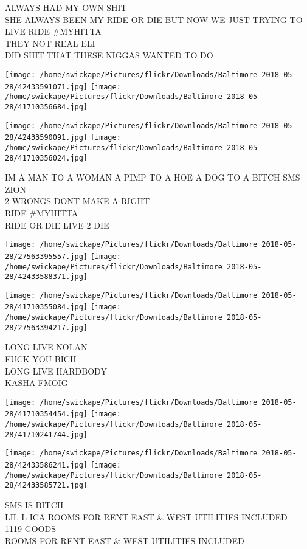 \documentclass[10pt,letterpaper]{article}
\begin{document}
ALWAYS HAD MY OWN SHIT\\
SHE ALWAYS BEEN MY RIDE OR DIE BUT NOW WE JUST TRYING TO LIVE RIDE \#MYHITTA\\
THEY NOT REAL ELI\\
DID SHIT THAT THESE NIGGAS WANTED TO DO
\pagebreak

\texttt{[image: /home/swickape/Pictures/flickr/Downloads/Baltimore 2018-05-28/42433591071.jpg]}
\texttt{[image: /home/swickape/Pictures/flickr/Downloads/Baltimore 2018-05-28/41710356684.jpg]}

\texttt{[image: /home/swickape/Pictures/flickr/Downloads/Baltimore 2018-05-28/42433590091.jpg]}
\texttt{[image: /home/swickape/Pictures/flickr/Downloads/Baltimore 2018-05-28/41710356024.jpg]}

IM A MAN TO A WOMAN A PIMP TO A HOE A DOG TO A BITCH SMS ZION\\
2 WRONGS DONT MAKE A RIGHT\\
RIDE \#MYHITTA\\
RIDE OR DIE LIVE 2 DIE
\pagebreak

\texttt{[image: /home/swickape/Pictures/flickr/Downloads/Baltimore 2018-05-28/27563395557.jpg]}
\texttt{[image: /home/swickape/Pictures/flickr/Downloads/Baltimore 2018-05-28/42433588371.jpg]}

\texttt{[image: /home/swickape/Pictures/flickr/Downloads/Baltimore 2018-05-28/41710355084.jpg]}
\texttt{[image: /home/swickape/Pictures/flickr/Downloads/Baltimore 2018-05-28/27563394217.jpg]}

LONG LIVE NOLAN\\
FUCK YOU BICH\\
LONG LIVE HARDBODY\\
KASHA FMOIG
\pagebreak

\texttt{[image: /home/swickape/Pictures/flickr/Downloads/Baltimore 2018-05-28/41710354454.jpg]}
\texttt{[image: /home/swickape/Pictures/flickr/Downloads/Baltimore 2018-05-28/41710241744.jpg]}

\texttt{[image: /home/swickape/Pictures/flickr/Downloads/Baltimore 2018-05-28/42433586241.jpg]}
\texttt{[image: /home/swickape/Pictures/flickr/Downloads/Baltimore 2018-05-28/42433585721.jpg]}

SMS IS BITCH\\
LIL L ICA ROOMS FOR RENT EAST \& WEST UTILITIES INCLUDED\\
1119 GOODS\\
ROOMS FOR RENT EAST \& WEST UTILITIES INCLUDED
\pagebreak
\end{document}
